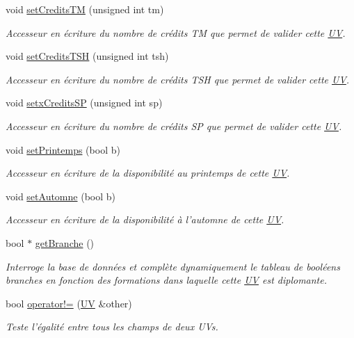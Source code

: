 \begin{DoxyCompactItemize}
void \hyperlink{class_u_v_ab25119addbc4118a7e018f8b1e1b2bec}{set\-Credits\-T\-M} (unsigned int tm)
\begin{DoxyCompactList}\small\item\em Accesseur en écriture du nombre de crédits T\-M que permet de valider cette \hyperlink{class_u_v}{U\-V}. \end{DoxyCompactList}\item 
void \hyperlink{class_u_v_a0bb36d962f2d3138239fc361714c8a39}{set\-Credits\-T\-S\-H} (unsigned int tsh)
\begin{DoxyCompactList}\small\item\em Accesseur en écriture du nombre de crédits T\-S\-H que permet de valider cette \hyperlink{class_u_v}{U\-V}. \end{DoxyCompactList}\item 
void \hyperlink{class_u_v_a4e0cf1293aae9d67ecac693a1a5f427e}{setx\-Credits\-S\-P} (unsigned int sp)
\begin{DoxyCompactList}\small\item\em Accesseur en écriture du nombre de crédits S\-P que permet de valider cette \hyperlink{class_u_v}{U\-V}. \end{DoxyCompactList}\item 
void \hyperlink{class_u_v_a68343634c4849e078293a16d9bee6bcb}{set\-Printemps} (bool b)
\begin{DoxyCompactList}\small\item\em Accesseur en écriture de la disponibilité au printemps de cette \hyperlink{class_u_v}{U\-V}. \end{DoxyCompactList}\item 
void \hyperlink{class_u_v_a5b635154275bd3c5cd2cb4aa3465f115}{set\-Automne} (bool b)
\begin{DoxyCompactList}\small\item\em Accesseur en écriture de la disponibilité à l'automne de cette \hyperlink{class_u_v}{U\-V}. \end{DoxyCompactList}\item 
bool $\ast$ \hyperlink{class_u_v_ad7a90a92f1a93d7e32c93b59468484bb}{get\-Branche} ()
\begin{DoxyCompactList}\small\item\em Interroge la base de données et complète dynamiquement le tableau de booléens branches en fonction des formations dans laquelle cette \hyperlink{class_u_v}{U\-V} est diplomante. \end{DoxyCompactList}\item 
bool \hyperlink{class_u_v_a06ed5e33c1ac60b05c40ba6f575afde1}{operator!=} (\hyperlink{class_u_v}{U\-V} \&other)
\begin{DoxyCompactList}\small\item\em Teste l'égalité entre tous les champs de deux U\-Vs. \end{DoxyCompactList}\end{DoxyCompactItemize}


